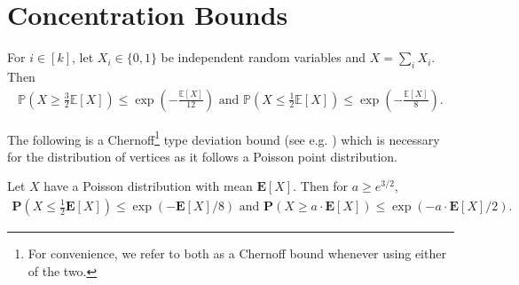 \documentclass[letterpaper,11pt]{article}
\newcommand{\E}[1]{\mathbf{E}\left[#1\right]}
\newcommand{\Exp}[1]{\mathbb{E}\left[#1\right]}
\newcommand{\Prob}[1]{\mathbf{P}\left(#1\right)}
\newcommand{\Pro}[1]{\mathbb{P}\left(#1\right)}
\newcommand{\1}{\mathbb I}
\begin{document}
\section{Concentration Bounds}
%
\begin{lemma}\label{lem:Chernoff}
For $i \in [k]$, let $X_i \in \{0,1\}$ be independent random variables and $X = \sum_i X_i$. Then
%
\begin{align*}
    \Pro{X\geq \frac{3}{2}\Exp{X}} \leq \exp{\left(-\frac{\Exp{X}}{12}\right)} \text{ and }
    \Pro{X\leq \frac{1}{2}\Exp{X}} \leq \exp{\left(- \frac{\Exp{X}}{8}\right)}.
\end{align*}
%
\end{lemma}
%
The following is a Chernoff\footnote{For convenience, we refer to both as a Chernoff bound whenever using either of the two.} type deviation bound (see e.g. \cite[Lemma 6]{Kiwi2024}) which is necessary for the distribution of vertices as it follows a Poisson point distribution.
%
\begin{lemma}\label{lem:Poisson-Chernoff}
    Let $X$ have a Poisson distribution with mean $\E{X}$. Then for $a \geq e^{3/2}$,
    \begin{align*}
        \Prob{X\leq \frac{1}{2}\E{X}} \leq \exp{(- \E{X}/8)} \text{ and }
    \Prob{X\geq a\cdot\E{X}} \leq \exp{(-a\cdot \E{X} /2)}.
    \end{align*}
\end{lemma}
%
\end{document}
